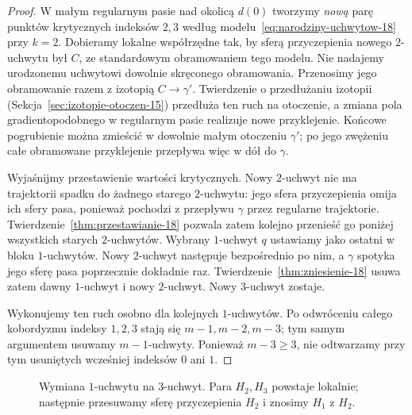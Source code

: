 \begin{proof}
W małym regularnym pasie nad okolicą $d(0)$ tworzymy
\emph{nową} parę punktów krytycznych indeksów $2,3$ według
modelu~\eqref{eq:narodziny-uchwytow-18} przy $k=2$.
Dobieramy lokalne współrzędne tak, by sferą przyczepienia nowego
$2$-uchwytu był $C$, ze standardowym obramowaniem tego modelu.
Nie nadajemy urodzonemu uchwytowi dowolnie skręconego obramowania.
Przenosimy jego obramowanie razem z izotopią $C\to\gamma'$.
Twierdzenie o przedłużaniu izotopii
(Sekcja~\ref{sec:izotopie-otoczen-15}) przedłuża ten ruch na
otoczenie, a zmiana pola gradientopodobnego w regularnym pasie
realizuje nowe przyklejenie. Końcowe pogrubienie można zmieścić
w dowolnie małym otoczeniu $\gamma'$; po jego zwężeniu
całe obramowane przyklejenie przepływa więc w dół do $\gamma$.

Wyjaśnijmy przestawienie wartości krytycznych. Nowy $2$-uchwyt
nie ma trajektorii spadku do żadnego starego $2$-uchwytu:
jego sfera przyczepienia omija ich sfery pasa, ponieważ pochodzi
z przepływu $\gamma$ przez regularne trajektorie.
Twierdzenie~\ref{thm:przestawianie-18} pozwala zatem kolejno
przenieść go poniżej wszystkich starych $2$-uchwytów.
Wybrany $1$-uchwyt $q$ ustawiamy jako ostatni w bloku
$1$-uchwytów. Nowy $2$-uchwyt następuje bezpośrednio po nim,
a $\gamma$ spotyka jego sferę pasa poprzecznie dokładnie raz.
Twierdzenie~\ref{thm:zniesienie-18}
usuwa zatem dawny
$1$-uchwyt i nowy
$2$-uchwyt. Nowy
$3$-uchwyt zostaje.

Wykonujemy ten ruch osobno
dla kolejnych $1$-uchwytów.
Po odwróceniu całego
kobordyzmu indeksy
$1,2,3$ stają się
$m-1,m-2,m-3$;
tym samym argumentem
usuwamy $m-1$-uchwyty. Ponieważ $m-3\geq3$, nie odtwarzamy
przy tym usuniętych wcześniej indeksów $0$ ani $1$.
\end{proof}

\begin{figure}[htbp]
\centering
{}
\caption{Wymiana $1$-uchwytu na $3$-uchwyt.
Para $H_2,H_3$ powstaje lokalnie; następnie
przesuwamy sferę przyczepienia $H_2$
i znosimy $H_1$ z $H_2$.}
\label{fig:wymiana-1-na-3-19}
\end{figure}

